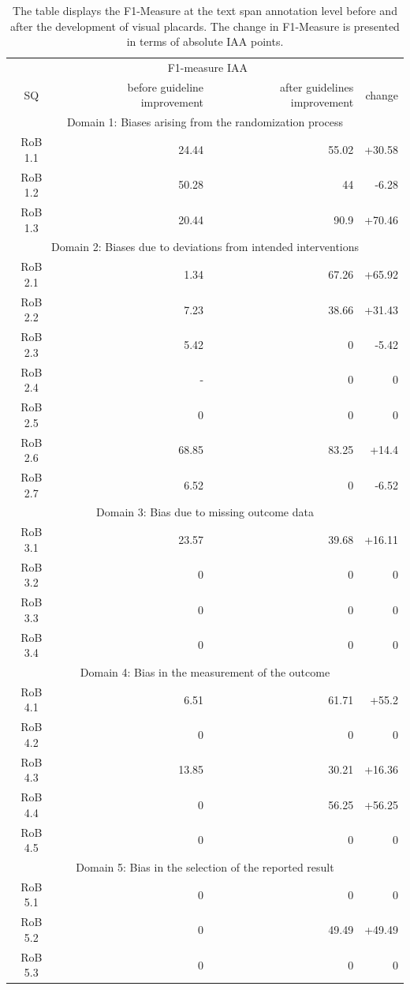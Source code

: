 \documentclass[sn-mathphys,Numbered]{sn-jnl}%
\theoremstyle{thmstyleone}%
\theoremstyle{thmstyletwo}%
\theoremstyle{thmstylethree}%
\begin{document}
\begin{table}[htb]
    \caption{The table displays the F1-Measure at the text span annotation level before and after the development of visual placards. The change in F1-Measure is presented in terms of absolute IAA points.}
    \label{tab:IAA_sq}
    \centering
    \begin{tabular}{crrr}
    \toprule[1.0pt]
         & \multicolumn{2}{c}{F1-measure IAA} & \\
        SQ & before guideline improvement & after guidelines improvement & change \\
    \midrule[1.0pt]
        \multicolumn{4}{c}{Domain 1: Biases arising from the randomization process} \\
        \hline
        RoB 1.1 & 24.44 & 55.02 & +30.58 \\ 
        RoB 1.2 & 50.28 & 44 & -6.28 \\ 
        RoB 1.3 & 20.44 & 90.9 & +70.46 \\
        \hline
        \multicolumn{4}{c}{Domain 2: Biases due to deviations from intended interventions} \\
        \hline
        RoB 2.1 & 1.34 & 67.26 & +65.92 \\ 
        RoB 2.2 & 7.23 & 38.66 & +31.43 \\ 
        RoB 2.3 & 5.42 & 0 & -5.42 \\ 
        RoB 2.4 & - & 0 & 0 \\ 
        RoB 2.5 & 0 & 0 & 0 \\ 
        RoB 2.6 & 68.85 & 83.25 & +14.4 \\ 
        RoB 2.7 & 6.52 & 0 & -6.52 \\ 
        \hline
        \multicolumn{4}{c}{Domain 3: Bias due to missing outcome data} \\
        \hline
        RoB 3.1 & 23.57 & 39.68 & +16.11 \\ 
        RoB 3.2 & 0 & 0 & 0 \\ 
        RoB 3.3 & 0 & 0 & 0 \\ 
        RoB 3.4 & 0 & 0 & 0 \\ 
        \hline
        \multicolumn{4}{c}{Domain 4: Bias in the measurement of the outcome} \\
        \hline
        RoB 4.1 & 6.51 & 61.71 & +55.2 \\ 
        RoB 4.2 & 0 & 0 & 0 \\ 
        RoB 4.3 & 13.85 & 30.21 & +16.36 \\ 
        RoB 4.4 & 0 & 56.25 & +56.25 \\ 
        RoB 4.5 & 0 & 0 & 0 \\ 
        \hline
        \multicolumn{4}{c}{Domain 5: Bias in the selection of the reported result} \\
        \hline
        RoB 5.1 & 0 & 0 & 0 \\ 
        RoB 5.2 & 0 & 49.49 & +49.49 \\ 
        RoB 5.3 & 0 & 0 & 0 \\
    \bottomrule[1.0pt]
    \end{tabular}
\end{table}
%
%
%
\end{document}
